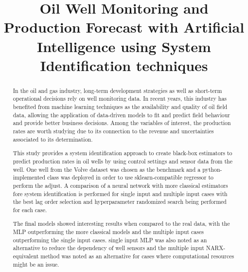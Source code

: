 \documentclass[conference]{IEEEtran}
\begin{document}
\graphicspath{{images/}}

\title{Oil Well Monitoring and Production Forecast with Artificial Intelligence using System Identification techniques}

\author{}

\maketitle

\begin{abstract}
In the oil and gas industry, long-term development strategies as well as short-term operational decisions rely on well monitoring data. In recent years, this industry has benefited from machine learning techniques as the availability and quality of oil field data, allowing the application of data-driven models to fit and predict field behaviour and provide better business decisions. Among the variables of interest, the production rates are worth studying due to its connection to the revenue and uncertainties associated to its determination.

This study provides a system identification approach to create black-box estimators to predict production rates in oil wells by using control settings and sensor data from the well. One well from the Volve dataset was chosen as the benchmark and a python-implemented class was deployed in order to use sklearn-compatible regressor to perform the adjust. A comparison of a neural network with more classical estimators fore system identification is performed for single input and multiple input cases with the best lag order selection and hyperparameter randomized search being performed for each case.

The final models showed interesting results when compared to the real data, with the MLP outperforming the more classical models and the multiple input cases outperforming the single input cases. single input MLP was also noted as an alternative to reduce the dependency of well sensors and the multiple input NARX-equivalent method was noted as an alternative for cases where computational resources might be an issue.



\end{abstract}
\end{document}
